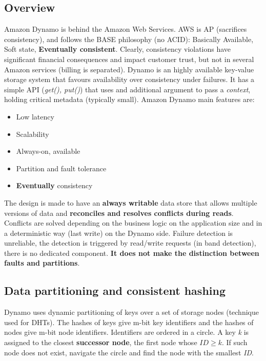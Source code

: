 	\subsection{Overview}
	Amazon Dynamo is behind the Amazon Web Services. AWS is AP (sacrifices consistency), and follows the BASE philosophy (no ACID): Basically Available, Soft state, \textbf{Eventually consistent}.\newline
	Clearly, consistency violations have significant financial consequences and impact customer trust, but not in several Amazon services (billing is separated).\newline
	\newline
	Dynamo is an highly available key-value storage system that favours availability over consistency under failures.\newline
	It has a simple API (\textit{get(), put()}) that uses and additional argument to pass a \textit{context}, holding critical metadata (typically small).\newline
	Amazon Dynamo main features are:
	\begin{itemize}
		\item Low latency
		\item Scalability
		\item Always-on, available
		\item Partition and fault tolerance
		\item \textbf{Eventually} consistency
	\end{itemize}
	The design is made to have an \textbf{always writable} data store that allows multiple versions of data and \textbf{reconciles and resolves conflicts during reads}. Conflicts are solved depending on the business logic on the application size and in a deterministic way (last write) on the Dynamo side.\newline
	Failure detection is unreliable, the detection is triggered by read/write requests (in band detection), there is no dedicated component. \textbf{It does not make the distinction between faults and partitions}.
	\subsection{Data partitioning and consistent hashing}
	Dynamo uses dynamic partitioning of keys over a set of storage nodes (technique used for DHTs).\newline
	The hashes of keys give m-bit key identifiers and the hashes of nodes give m-bit node identifiers. Identifiers are ordered in a circle.\newline
	A key \textit{k} is assigned to the closest \textbf{successor node}, the first node whose $ID\geq k$. If such node does not exist, navigate the circle and find the node with the smallest \textit{ID}.

